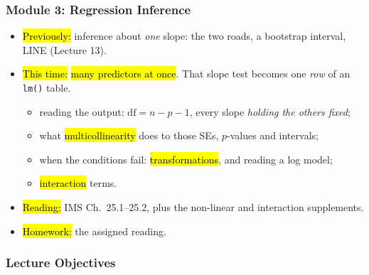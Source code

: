 

\begin{frame}
\frametitle{Module 3: Regression Inference}
    \begin{itemize}
        \item \hl{Previously:} inference about \emph{one} slope: the two roads, a bootstrap interval, LINE (Lecture 13).
        \item \hl{This time:} \hl{many predictors at once}. That slope test becomes one \emph{row} of an \texttt{lm()} table.
          \begin{itemize}
              \item reading the output: $\mathrm{df} = n-p-1$, every slope \emph{holding the others fixed};
              \item what \hl{multicollinearity} does to those SEs, $p$-values and intervals;
              \item when the conditions fail: \hl{transformations}, and reading a log model;
              \item \hl{interaction} terms.
          \end{itemize}
        \item \hl{Reading:} IMS Ch.\ 25.1--25.2, plus the non-linear and interaction supplements.
        \item \hl{Homework:} the assigned reading.
    \end{itemize}
\end{frame}


\begin{frame}
    \frametitle{Lecture Objectives}
\end{frame}


